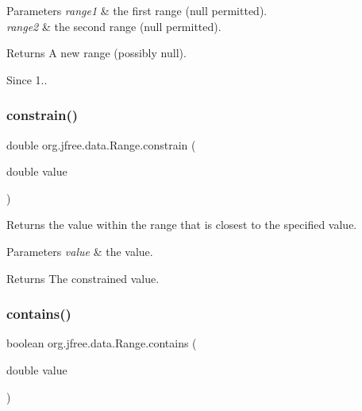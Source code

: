 \begin{DoxyParams}{Parameters}
{\em range1} & the first range ({\ttfamily null} permitted). \\
\hline
{\em range2} & the second range ({\ttfamily null} permitted).\\
\hline
\end{DoxyParams}
\begin{DoxyReturn}{Returns}
A new range (possibly {\ttfamily null}).
\end{DoxyReturn}
\begin{DoxySince}{Since}
1.. 
\end{DoxySince}
\mbox{\label{classorg_1_1jfree_1_1data_1_1_range_a1b4f861b494f28fa7c3775b70c5f166c}} 
\subsubsection{\texorpdfstring{constrain()}{constrain()}}
{\footnotesize\ttfamily double org.\+jfree.\+data.\+Range.\+constrain (\begin{DoxyParamCaption}\item[{double}]{value }\end{DoxyParamCaption})}

Returns the value within the range that is closest to the specified value.


\begin{DoxyParams}{Parameters}
{\em value} & the value.\\
\hline
\end{DoxyParams}
\begin{DoxyReturn}{Returns}
The constrained value. 
\end{DoxyReturn}
\mbox{\label{classorg_1_1jfree_1_1data_1_1_range_addc9ad1ee912f4cb13720d01beaa8f9c}} 
\subsubsection{\texorpdfstring{contains()}{contains()}}
{\footnotesize\ttfamily boolean org.\+jfree.\+data.\+Range.\+contains (\begin{DoxyParamCaption}\item[{double}]{value }\end{DoxyParamCaption})}


